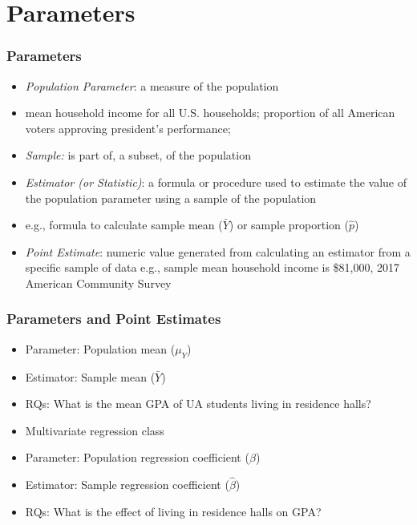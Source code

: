 

\section{Parameters}


\begin{frame}
\frametitle{Parameters}
\begin{itemize}
\item \emph{Population Parameter}: a measure of the population
\item mean household income for all U.S. households; proportion of all American voters approving president's performance;
\item \emph{Sample:} is part of, a subset, of the population
\item \emph{Estimator (or Statistic)}: a formula or procedure used to estimate the value of the population parameter using a sample of the population
\item e.g., formula to calculate sample mean (\(\bar{Y}\)) or sample
proportion (\(\hat{p}\))
\item \emph{Point Estimate}: numeric value generated from calculating an
estimator from a specific sample of data
e.g., sample mean household income is \$81,000, 2017 American
Community Survey
\end{itemize}
\end{frame}


\begin{frame}
\frametitle{Parameters and Point Estimates}
\begin{itemize}
\item Parameter: Population mean (\(\mu_Y\))
\item Estimator: Sample mean (\(\bar{Y}\))
\item RQs: What is the mean GPA of UA students living in residence halls?
\item Multivariate regression class
\item Parameter: Population regression coefficient (\(\beta\))
\item Estimator: Sample regression coefficient (\(\hat{\beta}\))
\item RQs: What is the effect of living in residence halls on GPA?
\end{itemize}
\end{frame}


